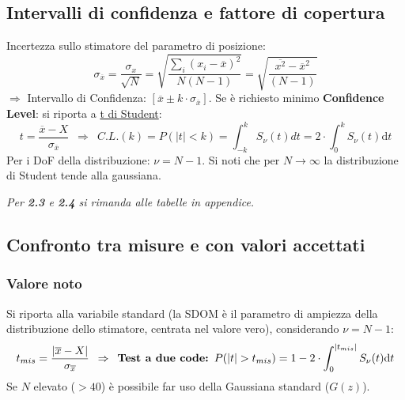 \documentclass[11pt]{article}
\begin{document}
\subsection{Intervalli di confidenza e fattore di copertura}
Incertezza sullo stimatore del parametro di posizione: 
\[\sigma_{\overline{x}} = \frac{\sigma_x}{\sqrt{N}} = \sqrt{\frac{\sum_i (x_i - \overline{x})^2}{N (N -1)}} = \sqrt{\frac{\overline{x^2} - \overline{x}^2}{(N -1)}}\]
$\Rightarrow$ 
Intervallo di Confidenza: $[ \overline{x} \pm k \cdot \sigma_{\overline{x}} ]$. Se è richiesto minimo \textbf{Confidence Level}: si riporta a \underline{t di Student}:
\[t = \frac{\overline{x} - X}{\sigma_{\overline{x}}} \enspace \Rightarrow \enspace C.L. (k) = P(|t| < k) = \int_{-k}^{k} S_\nu(t) dt = 2 \cdot \int_{0}^{k} S_\nu(t) \textrm{d}t\]
Per i DoF della distribuzione: $\nu = N - 1$. Si noti che per $N \rightarrow \infty$ la distribuzione di Student tende alla gaussiana.

\begin{center}\textit{Per \textbf{2.3} e \textbf{2.4} si rimanda alle tabelle in appendice.}
\end{center}

\subsection{Confronto tra misure e con valori accettati}
\subsubsection*{Valore noto}
Si riporta alla variabile standard (la SDOM è il parametro di ampiezza della distribuzione dello stimatore, centrata nel valore vero), considerando $\nu = N - 1$:
\[t_{mis} = \frac{|\overline{x} - X|}{\sigma_{\overline{x}}} \enspace \Rightarrow \enspace \textrm{\textbf{Test a due code: }} P(|t| > t_{mis}) = 1 - 2 \cdot \int_{0}^{|t_{mis}|} S_\nu(t) \textrm{d}t\]
Se $N$ elevato ($> 40$) è possibile far uso della Gaussiana standard ($G(z)$).
\end{document}
